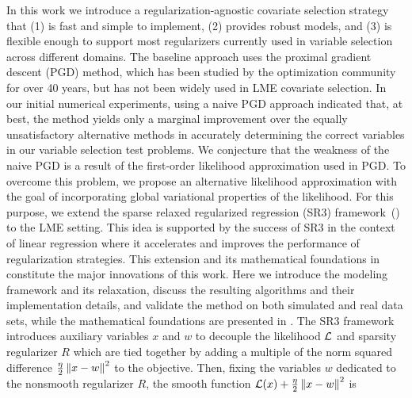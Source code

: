 In this work we introduce a regularization-agnostic covariate selection strategy that (1) is fast and simple to implement, (2) provides robust models, and (3) is flexible enough to support most regularizers currently used in variable selection across different domains.  The baseline approach uses the proximal gradient descent (PGD) method, which has been studied by the optimization community for over 40 years, but has not been widely used in LME covariate selection. 
In our initial numerical experiments, using a naive PGD approach
indicated that, at best, the method yields only a marginal improvement over the
equally unsatisfactory alternative methods   
in accurately determining the correct variables in our variable selection test problems.
We conjecture that the weakness of the naive PGD is a result of the 
first-order likelihood approximation used in PGD.
To overcome this problem, we propose an alternative likelihood approximation 
with the goal of 
incorporating global variational properties of the likelihood. For this purpose,  
we extend the sparse relaxed regularized regression (SR3) framework~{(\cite{Zheng2019SR3})} to the LME setting. 
This idea is supported
by the success of SR3 in the context of linear regression where it
accelerates and improves the performance of regularization strategies.
This extension and its mathematical foundations in \cite{Theory1} constitute
the major innovations of this work.
Here we introduce the modeling framework and its relaxation, discuss the 
resulting algorithms and their implementation details, and  validate the method on both
simulated and real data sets, while the 
mathematical 
foundations are presented in \cite{Theory1}.
The SR3 framework introduces auxiliary variables $x$ and $w$ to 
decouple the likelihood $\operatorname{\mathcal{L}}$ and sparsity regularizer $R$ which are tied
together by adding a multiple of the norm squared difference 
$\frac{\eta}{2}\left\Vert x-w\right\Vert^2$ to the
objective. 
Then, fixing the variables $w$ dedicated to the nonsmooth regularizer $R$, 
the smooth function $\operatorname{\mathcal{L}}(x)+\frac{\eta}{2}\left\Vert x-w\right\Vert^2$ is
